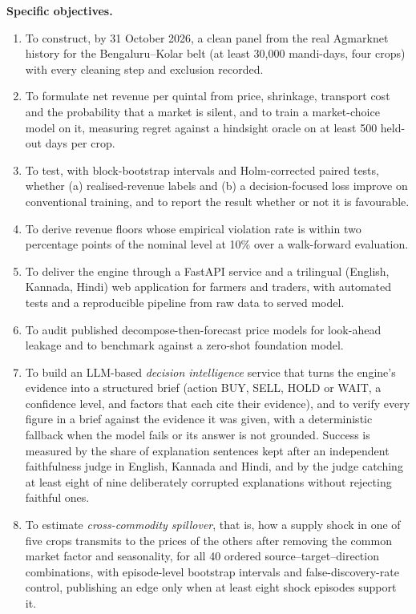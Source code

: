 \noindent \textbf{Specific objectives.}
\begin{enumerate}
    \item To construct, by 31 October 2026, a clean panel from the real Agmarknet history for the Bengaluru--Kolar belt (at least 30,000 mandi-days, four crops) with every cleaning step and exclusion recorded.
    \item To formulate net revenue per quintal from price, shrinkage, transport cost and the probability that a market is silent, and to train a market-choice model on it, measuring regret against a hindsight oracle on at least 500 held-out days per crop.
    \item To test, with block-bootstrap intervals and Holm-corrected paired tests, whether (a) realised-revenue labels and (b) a decision-focused loss improve on conventional training, and to report the result whether or not it is favourable.
    \item To derive revenue floors whose empirical violation rate is within two percentage points of the nominal level at 10\% over a walk-forward evaluation.
    \item To deliver the engine through a FastAPI service and a trilingual (English, Kannada, Hindi) web application for farmers and traders, with automated tests and a reproducible pipeline from raw data to served model.
    \item To audit published decompose-then-forecast price models for look-ahead leakage and to benchmark against a zero-shot foundation model.
    \item To build an LLM-based \emph{decision intelligence} service that turns the engine's evidence into a structured brief (action BUY, SELL, HOLD or WAIT, a confidence level, and factors that each cite their evidence), and to verify every figure in a brief against the evidence it was given, with a deterministic fallback when the model fails or its answer is not grounded. Success is measured by the share of explanation sentences kept after an independent faithfulness judge in English, Kannada and Hindi, and by the judge catching at least eight of nine deliberately corrupted explanations without rejecting faithful ones.
    \item To estimate \emph{cross-commodity spillover}, that is, how a supply shock in one of five crops transmits to the prices of the others after removing the common market factor and seasonality, for all 40 ordered source--target--direction combinations, with episode-level bootstrap intervals and false-discovery-rate control, publishing an edge only when at least eight shock episodes support it.

\end{enumerate}
